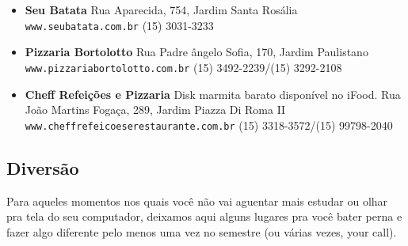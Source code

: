 \begin{multicols}{2}
\begin{itemize}
  \end{itemize}
  \begin{itemize}
    \item \textbf{Seu Batata}
      \newline Rua Aparecida, 754, Jardim Santa Rosália
      \newline \texttt{www.seubatata.com.br}
      \newline (15) 3031-3233
  \end{itemize}
  \begin{itemize}
    \item \textbf{Pizzaria Bortolotto}
      \newline Rua Padre ângelo Sofia, 170, Jardim Paulistano
      \newline \texttt{www.pizzariabortolotto.com.br}
      \newline (15) 3492-2239/(15) 3292-2108
  \end{itemize}
  \begin{itemize}
    \item \textbf{Cheff Refeições e Pizzaria}
      \newline Disk marmita barato disponível no iFood.
      \newline Rua João Martins Fogaça, 289, Jardim Piazza Di Roma II
      \newline \texttt{www.cheffrefeicoeserestaurante.com.br}
      \newline (15) 3318-3572/(15) 99798-2040
  \end{itemize}
\end{multicols}

\subsection{Diversão}
Para aqueles momentos nos quais você não vai aguentar mais estudar ou olhar pra tela do seu computador, deixamos aqui alguns lugares pra você bater perna e fazer algo diferente pelo menos uma vez no semestre (ou várias vezes, your call).

